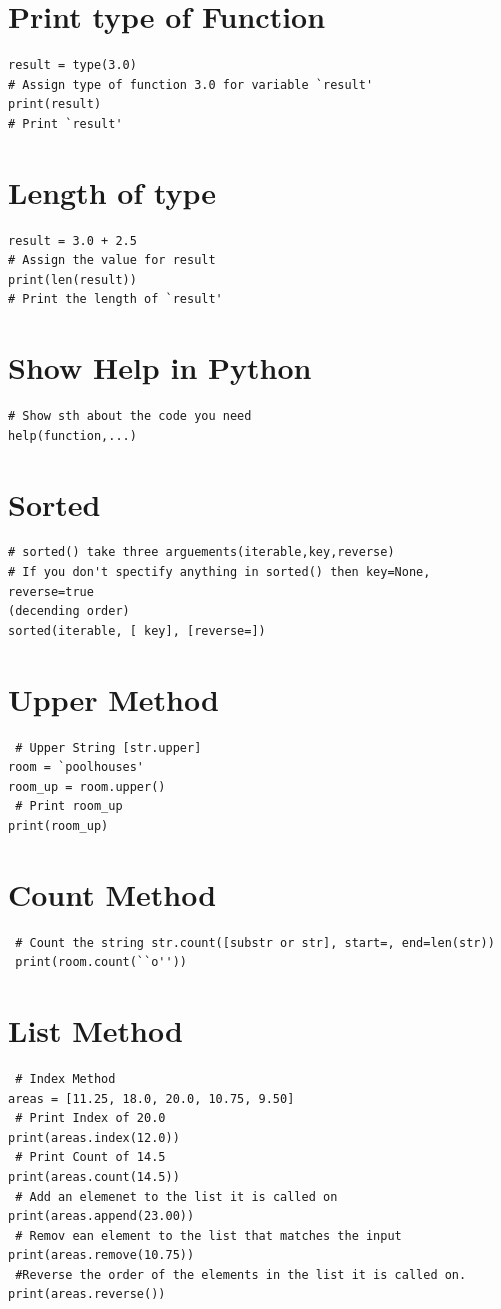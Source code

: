 \documentclass[12pt]{article}
\begin{document}
\section{Print type of Function}
\begin{lstlisting}
result = type(3.0)
# Assign type of function 3.0 for variable `result'
print(result)
# Print `result'
\end{lstlisting}
\pagebreak
\section{Length of type}
\begin{lstlisting}[frame=single]
result = 3.0 + 2.5
# Assign the value for result
print(len(result))
# Print the length of `result'
\end{lstlisting}
\section{Show Help in Python}
\begin{lstlisting}
# Show sth about the code you need
help(function,...)
\end{lstlisting}
\section{Sorted}
\begin{lstlisting}
# sorted() take three arguements(iterable,key,reverse)
# If you don't spectify anything in sorted() then key=None, reverse=true
(decending order)
sorted(iterable, [ key], [reverse=])
\end{lstlisting}
\section{Upper Method}
\begin{lstlisting}
 # Upper String [str.upper]
room = `poolhouses'
room_up = room.upper()
 # Print room_up
print(room_up)
\end{lstlisting}
\section{Count Method}
\begin{lstlisting}
 # Count the string str.count([substr or str], start=, end=len(str))
 print(room.count(``o''))
\end{lstlisting}
\section{List Method}
\begin{lstlisting}
 # Index Method
areas = [11.25, 18.0, 20.0, 10.75, 9.50]
 # Print Index of 20.0
print(areas.index(12.0))
 # Print Count of 14.5
print(areas.count(14.5))
 # Add an elemenet to the list it is called on
print(areas.append(23.00))
 # Remov ean element to the list that matches the input
print(areas.remove(10.75))
 #Reverse the order of the elements in the list it is called on.
print(areas.reverse())
\end{lstlisting}
\end{document}
